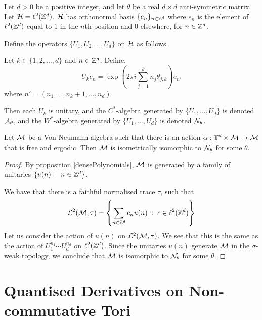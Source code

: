 \begin{definition}
    Let $d > 0$ be a positive integer, and let $\theta$ be a
    real $d\times d$ anti-symmetric matrix. Let $\mathcal{H} = \ell^2(\mathbb{Z}^d)$.
    $\mathcal{H}$ has orthonormal basis $\{e_n\}_{n \in \mathbb{Z}^d}$
    where $e_n$ is the element of $\ell^2(\mathbb{Z}^d)$ equal to $1$
    in the $n$th position and $0$ elsewhere, for $n \in \mathbb{Z}^d$. 
    
     Define
    the operators $\{U_1,U_2,\ldots,U_d\}$ on $\mathcal{H}$ as follows.
    
    Let $k \in \{1,2,\ldots,d\}$ and $n \in \mathbb{Z}^d$. Define,
    \begin{equation*}
        U_k e_n = \exp\left(2\pi i \sum_{j=1}^k n_j\theta_{j,k}\right)e_{n'}
    \end{equation*} 
    where $n' = (n_1,\ldots,n_k+1,\ldots,n_d)$.
    
    Then each $U_k$ is unitary, and the $C^*$-algebra
    generated by $\{U_1,\ldots,U_d\}$ is denoted $\mathcal{A}_\theta$,
    and the $W^*$-algebra generated by $\{U_1,\ldots,U_d\}$ is denoted
    $\mathcal{N}_\theta$.
\end{definition}


\begin{proposition}
    Let $\mathcal{M}$ be a Von Neumann algebra such that there is an action
    $\alpha:\mathbb{T}^d\times \mathcal{M}\to\mathcal{M}$ that is free and ergodic. Then $\mathcal{M}$
    is isometrically isomorphic to $\mathcal{N}_\theta$ for some $\theta$.
\end{proposition}
\begin{proof}
    By proposition \ref{densePolynomials}, $\mathcal{M}$ is generated
    by a family of unitaries $\{u(n)\;:\;n \in \mathbb{Z}^d\}$.
    
    We have that there is a faithful normalised trace $\tau$, such that
    \begin{equation}
        \mathcal{L}^2(\mathcal{M},\tau) = \left\{\sum_{n \in \mathbb{Z}^d} c_nu(n)\;:\; c \in \ell^2(\mathbb{Z}^d)\right\}
    \end{equation}
    Let us consider the action of $u(n)$ on $\mathcal{L}^2(\mathcal{M},\tau)$. We
    see that this is the same as the action of $U_1^{n_1}\cdots U_d^{n_d}$
    on $\ell^2(\mathbb{Z}^d)$. Since the unitaries $u(n)$ generate $\mathcal{M}$ 
    in the $\sigma$-weak topology, we conclude that $\mathcal{M}$
    is isomorphic to $\mathcal{N}_\theta$ for some $\theta$.
\end{proof}

\section{Quantised Derivatives on Non-commutative Tori}

